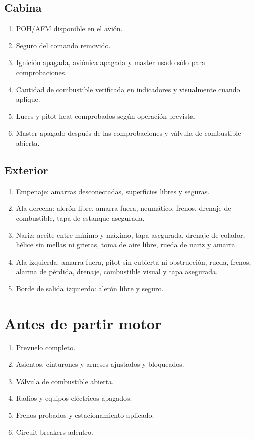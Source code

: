\documentclass[11pt,oneside]{book}
\newenvironment{checklist}{\begin{enumerate}[label=\arabic*.]}{\end{enumerate}}
\begin{document}
\subsection{Cabina}
\begin{checklist}
\item POH/AFM disponible en el avión.
\item Seguro del comando removido.
\item Ignición apagada, aviónica apagada y master usado sólo para comprobaciones.
\item Cantidad de combustible verificada en indicadores y visualmente cuando aplique.
\item Luces y pitot heat comprobados según operación prevista.
\item Master apagado después de las comprobaciones y válvula de combustible abierta.
\end{checklist}

\subsection{Exterior}
\begin{checklist}
\item Empenaje: amarras desconectadas, superficies libres y seguras.
\item Ala derecha: alerón libre, amarra fuera, neumático, frenos, drenaje de combustible, tapa de estanque asegurada.
\item Nariz: aceite entre mínimo y máximo, tapa asegurada, drenaje de colador, hélice sin mellas ni grietas, toma de aire libre, rueda de nariz y amarra.
\item Ala izquierda: amarra fuera, pitot sin cubierta ni obstrucción, rueda, frenos, alarma de pérdida, drenaje, combustible visual y tapa asegurada.
\item Borde de salida izquierdo: alerón libre y seguro.
\end{checklist}

\section{Antes de partir motor}

\begin{checklist}
\item Prevuelo completo.
\item Asientos, cinturones y arneses ajustados y bloqueados.
\item Válvula de combustible abierta.
\item Radios y equipos eléctricos apagados.
\item Frenos probados y estacionamiento aplicado.
\item Circuit breakers adentro.
\end{checklist}
\end{document}
